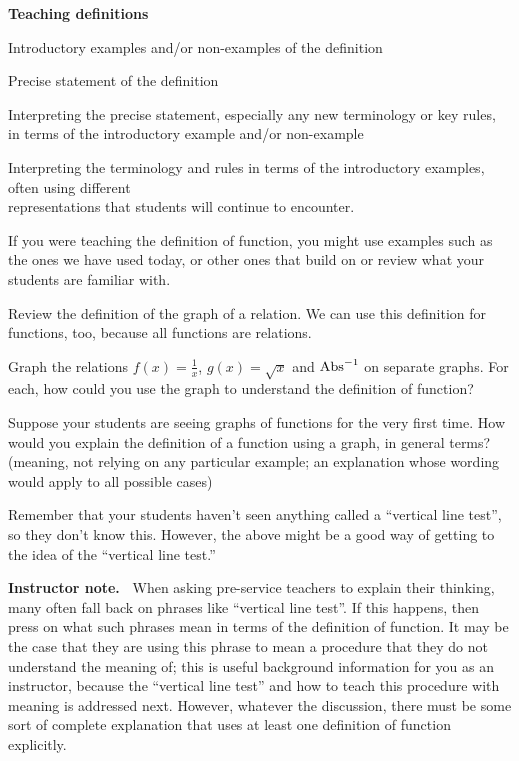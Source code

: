 \documentclass[11pt]{article}
\newenvironment{bignote}[1][Instructor note]%
	{\begin{mdframed}\raggedright{\bf #1.~}}
	{\end{mdframed}}
\newenvironment{task}
	{\begin{mdframed}[linecolor=lightgray, linewidth=3pt]\raggedright}
	{\end{mdframed}}
\newcommand\tn{\textnormal}
\theoremstyle{definition}
\begin{document}
\begin{mdframed}
\begin{center}
{\bf Teaching definitions}
\end{center}
\vspace*{-4pt}
	\begin{itemize*}
	\item Introductory examples and/or non-examples of the definition
	\item Precise statement of the definition
	\item Interpreting the precise statement, especially any new terminology or key rules, in terms of the introductory example and/or non-example
	\item Interpreting the terminology and rules in terms of the introductory examples, often using different \\ representations that students will continue to encounter.
	\end{itemize*}
\end{mdframed}

If you were teaching the definition of function, you might use examples such as the ones we have used today, or other ones that build on or review what your students are familiar with.

\begin{task}
Review the definition of the graph of a relation. We can use this definition for functions, too, because all functions are relations.

Graph the relations $f(x)=\frac{1}{x}$, $g(x)=\sqrt{x}$ and $\tn{Abs}^{-1}$ on separate graphs. For each, how could you use the graph to understand the definition of function?

Suppose your students are seeing graphs of functions for the very first time. How would you explain the definition of a function using a graph, in general terms? (meaning, not relying on any particular example; an explanation whose wording would apply to all possible cases)
\end{task}

Remember that your students haven't seen anything called a ``vertical line test'', so they don't know this. However, the above might be a good way of getting to the idea of the ``vertical line test.''

\begin{bignote}
When asking pre-service teachers to explain their thinking, many often fall back on phrases like ``vertical line test''. If this happens, then press on what such phrases mean in terms of the definition of function. It may be the case that they are using this phrase to mean a procedure that they do not understand the meaning of; this is useful background information for you as an instructor, because the ``vertical line test'' and how to teach this procedure with meaning is addressed next. However, whatever the discussion, there must be some sort of complete explanation that uses at least one definition of function explicitly.
\end{bignote}
\end{document}
